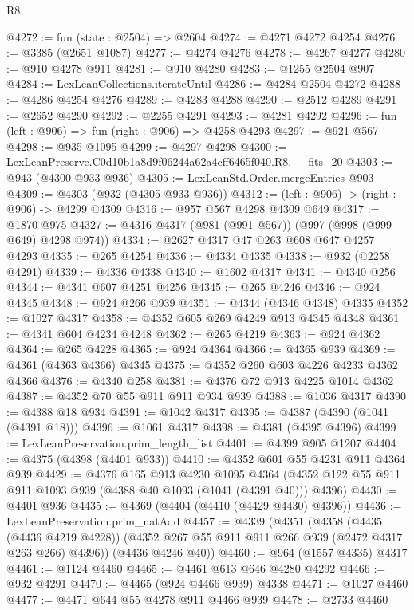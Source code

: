 \begin{lexlean}{R8}
\begin{coremodule}
@4272 := fun (state : @2504) => @2604
@4274 := @4271 @4272 @4254
@4276 := @3385 (@2651 @1087)
@4277 := @4274 @4276
@4278 := @4267 @4277
@4280 := @910 @4278 @911
@4281 := @910 @4280
@4283 := @1255 @2504 @907
@4284 := LexLeanCollections.iterateUntil
@4286 := @4284 @2504 @4272
@4288 := @4286 @4254 @4276
@4289 := @4283 @4288
@4290 := @2512 @4289
@4291 := @2652 @4290
@4292 := @2255 @4291
@4293 := @4281 @4292
@4296 := fun (left : @906) => fun (right : @906) => @4258 @4293
@4297 := @921 @567
@4298 := @935 @1095
@4299 := @4297 @4298
@4300 := LexLeanPreserve.C0d10b1a8d9f06244a62a4cff6465f040.R8.__fits_20
@4303 := @943 (@4300 @933 @936)
@4305 := LexLeanStd.Order.mergeEntries @903
@4309 := @4303 (@932 (@4305 @933 @936))
@4312 := (left : @906) -> (right : @906) -> @4299 @4309
@4316 := @957 @567 @4298 @4309 @649
@4317 := @1870 @975
@4327 := @4316 @4317 (@981 (@991 @567)) (@997 (@998 (@999 @649) @4298 @974))
@4334 := @2627 @4317 @47 @263 @608 @647 @4257 @4293
@4335 := @265 @4254
@4336 := @4334 @4335
@4338 := @932 (@2258 @4291)
@4339 := @4336 @4338
@4340 := @1602 @4317
@4341 := @4340 @256
@4344 := @4341 @607 @4251 @4256
@4345 := @265 @4246
@4346 := @924 @4345
@4348 := @924 @266 @939
@4351 := @4344 (@4346 @4348) @4335
@4352 := @1027 @4317
@4358 := @4352 @605 @269 @4249 @913 @4345 @4348
@4361 := @4341 @604 @4234 @4248
@4362 := @265 @4219
@4363 := @924 @4362
@4364 := @265 @4228
@4365 := @924 @4364
@4366 := @4365 @939
@4369 := @4361 (@4363 @4366) @4345
@4375 := @4352 @260 @603 @4226 @4233 @4362 @4366
@4376 := @4340 @258
@4381 := @4376 @72 @913 @4225 @1014 @4362
@4387 := @4352 @70 @55 @911 @911 @934 @939
@4388 := @1036 @4317
@4390 := @4388 @18 @934
@4391 := @1042 @4317
@4395 := @4387 (@4390 (@1041 (@4391 @18)))
@4396 := @1061 @4317
@4398 := @4381 (@4395 @4396)
@4399 := LexLeanPreservation.prim_length_list
@4401 := @4399 @905 @1207
@4404 := @4375 (@4398 (@4401 @933))
@4410 := @4352 @601 @55 @4231 @911 @4364 @939
@4429 := @4376
    @165
    @913
    @4230
    @1095
    @4364
    (@4352 @122 @55 @911 @911 @1093 @939 (@4388 @40 @1093 (@1041 (@4391 @40))) @4396)
@4430 := @4401 @936
@4435 := @4369 (@4404 (@4410 (@4429 @4430) @4396))
@4436 := LexLeanPreservation.prim_natAdd
@4457 := @4339
    (@4351
      (@4358
        (@4435 (@4436 @4219 @4228))
        (@4352 @267 @55 @911 @911 @266 @939 (@2472 @4317 @263 @266) @4396))
      (@4436 @4246 @40))
@4460 := @964 (@1557 @4335) @4317
@4461 := @1124 @4460
@4465 := @4461 @613 @646 @4280 @4292
@4466 := @932 @4291
@4470 := @4465 (@924 @4466 @939) @4338
@4471 := @1027 @4460
@4477 := @4471 @644 @55 @4278 @911 @4466 @939
@4478 := @2733 @4460

\end{coremodule}
\end{lexlean}
